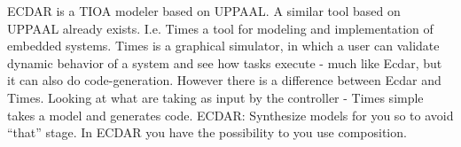 ECDAR is a TIOA modeler based on UPPAAL. A similar tool based on UPPAAL already exists. I.e. Times \cite{timestool} a tool for modeling and implementation of embedded systems. Times is a graphical simulator, in which a user can validate dynamic behavior of a system and see how tasks execute - much like Ecdar, but it can also do code-generation. However there is a difference between Ecdar and Times. Looking at what are taking as input by the controller - Times simple takes a model and generates code. ECDAR: Synthesize models for you so to avoid “that” stage. In ECDAR you have the possibility to you use composition.
